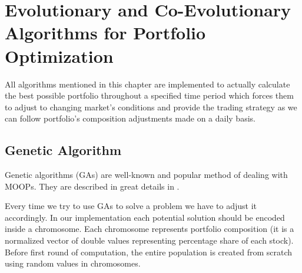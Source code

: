
\section{Evolutionary and Co-Evolutionary Algorithms for Portfolio
  Optimization}
\label{sec:system}

All algorithms mentioned in this chapter are implemented to actually calculate the best possible portfolio throughout a specified time period which
forces them to adjust to changing market's conditions and provide the trading strategy as we can follow portfolio's composition adjustments made on a daily 
basis.  


\subsection{Genetic Algorithm}
\label{GA}

Genetic algorithms (GAs) are well-known and popular method of dealing with MOOPs.
They are described in great details in \cite{Mitchell01}.

Every time we try to use GAs to solve a problem we have to adjust it accordingly.
In our implementation each potential solution should be encoded inside a chromosome. 
Each chromosome represents portfolio composition (it is a normalized vector of double values representing percentage share of each stock).
Before first round of computation, the entire population is created from scratch using random values in chromosomes.

